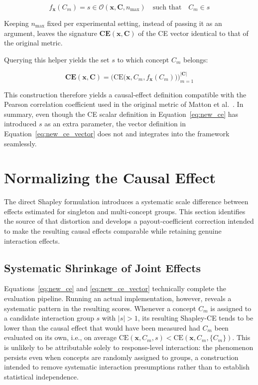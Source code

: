 \begin{equation}
	\label{eq:group_lookup}
	f_{\mathbf{x}}(C_m) = s \in \mathcal{O}(\mathbf{x}, \mathbf{C}, n_{\max}) \quad \text{such that} \quad C_m \in s
\end{equation}

Keeping $n_{\max}$ fixed per experimental setting, instead of passing it as an argument, leaves the signature $\mathbf{CE}(\mathbf{x},\mathbf{C})$ of the CE vector identical to that of the original metric.

Querying this helper yields the set $s$ to which concept $C_m$ belongs:

\begin{equation}
	\label{eq:new_ce_vector}
	\mathbf{CE}(\mathbf{x}, \mathbf{C}) = \Big( \mathrm{CE}\big(\mathbf{x}, C_m, f_{\mathbf{x}}(C_m)\big) \Big)_{m=1}^{|\mathbf{C}|}
\end{equation}

This construction therefore yields a causal-effect definition compatible with the Pearson correlation coefficient used in the original metric of Matton et al.~\cite{mattonWalkTalkMeasuring2024}. In summary, even though the CE scalar definition in Equation~\ref{eq:new_ce} has introduced $s$ as an extra parameter, the vector definition in Equation~\ref{eq:new_ce_vector} does not and integrates into the framework seamlessly.

\section{Normalizing the Causal Effect}
\label{sec:shapley_correction}
The direct Shapley formulation introduces a systematic scale difference between effects estimated for singleton and multi-concept groups. This section identifies the source of that distortion and develops a payout-coefficient correction intended to make the resulting causal effects comparable while retaining genuine interaction effects.

\subsection{Systematic Shrinkage of Joint Effects}
\label{sec:kl_ceiling}

Equations~\ref{eq:new_ce} and \ref{eq:new_ce_vector} technically complete the evaluation pipeline. Running an actual implementation, however, reveals a systematic pattern in the resulting scores. Whenever a concept $C_m$ is assigned to a candidate interaction group $s$ with $|s|>1$, its resulting Shapley-CE tends to be lower than the causal effect that would have been measured had $C_m$ been evaluated on its own, i.e., on average $\mathrm{CE}(\mathbf{x},C_m,s) < \mathrm{CE}(\mathbf{x},C_m,\{C_m\})$. This is unlikely to be attributable solely to response-level interaction: the phenomenon persists even when concepts are randomly assigned to groups, a construction intended to remove systematic interaction presumptions rather than to establish statistical independence.

